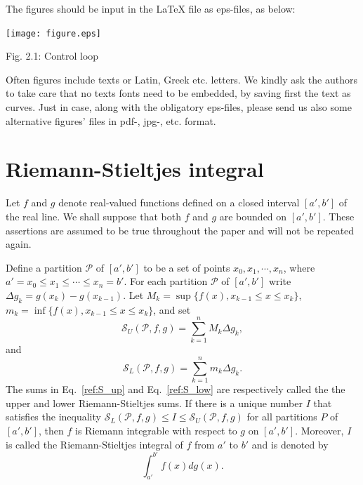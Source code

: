 \documentclass[twoside,reqno,11pt]{fcaa-var} %
\begin{document}
The figures should be input in the LaTeX file as eps-files, as below:

  \begin{center}
  \texttt{[image: figure.eps]}

 \bigskip

  Fig. 2.1: Control loop
  \end{center}

 Often figures include texts or Latin, Greek etc. letters.
 We kindly ask the authors to take care that no texts fonts need to be embedded, by saving first the text as curves.
 Just in case, along with the obligatory eps-files, please send us also some alternative figures' files in  pdf-, jpg-, etc. format.

\section{Riemann-Stieltjes integral}
Let $f$ and $g$ denote real-valued functions defined on a closed interval $[a',b']$ of the real line. We shall suppose that both $f$ and $g$ are bounded on $[a',b']$. These assertions are assumed to be true throughout the paper and will not be repeated again.

\begin{definition}
Define a partition $\mathcal{P}$ of $[a',b']$ to be a set of points $x_0, x_1,\cdots,x_n$, 
where $a' = x_0 \leq x_1 \leq \cdots \leq x_n = b'$. For each partition 
$\mathcal{P}$ of $[a',b']$ write $\Delta g_k = g(x_k)-g(x_{k-1})$. Let 
$M_k = \sup\{f(x),x_{k-1}\leq x \leq x_{k}\}$, $m_k = \inf\{f(x),x_{k-1}\leq x \leq x_{k}\}$, and set 
\begin{equation}
\label{ref:S_up}
\mathcal{S}_U(\mathcal{P},f,g) = \sum_{k=1}^n M_k \Delta g_k, 
\end{equation}
and
\begin{equation}
\label{ref:S_low}
\mathcal{S}_L(\mathcal{P},f,g) = \sum_{k=1}^n m_k \Delta g_k. 
\end{equation}
The sums in Eq.~\eqref{ref:S_up} and Eq.~\eqref{ref:S_low} are respectively called the the upper and lower Riemann-Stieltjes sums.
If there is a unique number $I$ that satisfies the inequality $\mathcal{S}_L(\mathcal{P},f,g)\leq I \leq \mathcal{S}_U(\mathcal{P},f,g)$ for all 
partitions $P$ of $[a',b']$, then $f$ is Riemann integrable with respect to $g$ on $[a',b']$. Moreover, $I$ is called the Riemann-Stieltjes integral of $f$ from $a'$ to $b'$ and is denoted by
\begin{equation}
\int_{a'}^{b'} f(x) dg(x). 
\end{equation}
\end{definition}
\end{document}
